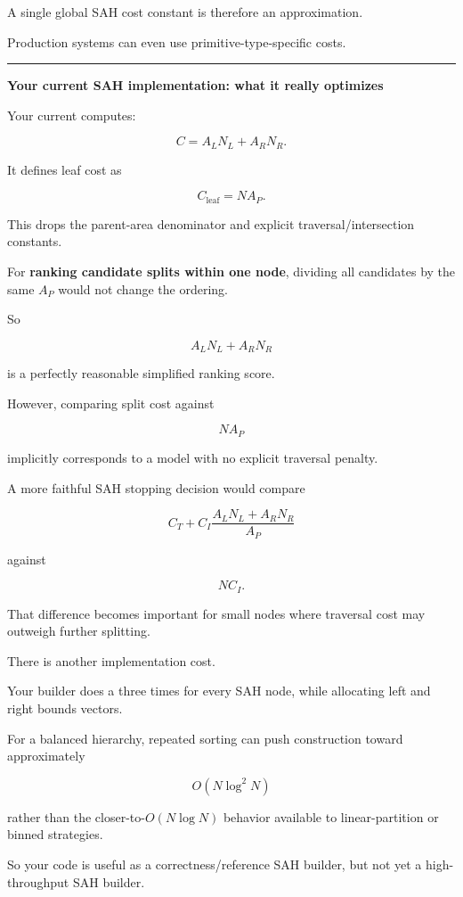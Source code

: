 A single global SAH cost constant is therefore an approximation.

Production systems can even use primitive-type-specific costs.

\begin{center}\rule{0.5\linewidth}{0.5pt}\end{center}

\textbf{Your current SAH implementation: what it really optimizes}

Your current  computes:

\[
C=
A_LN_L+A_RN_R.
\]

It defines leaf cost as

\[
C_{\text{leaf}}
=
NA_P.
\]

This drops the parent-area denominator and explicit traversal/intersection constants.

For \textbf{ranking candidate splits within one node}, dividing all candidates by the same \(A_P\) would not change the ordering.

So

\[
A_LN_L+A_RN_R
\]

is a perfectly reasonable simplified ranking score.

However, comparing split cost against

\[
NA_P
\]

implicitly corresponds to a model with no explicit traversal penalty.

A more faithful SAH stopping decision would compare

\[
C_T+
C_I\frac{A_LN_L+A_RN_R}{A_P}
\]

against

\[
NC_I.
\]

That difference becomes important for small nodes where traversal cost may outweigh further splitting.

There is another implementation cost.

Your builder does a  three times for every SAH node, while allocating left and right bounds vectors.

For a balanced hierarchy, repeated sorting can push construction toward approximately

\[
O(N\log^2 N)
\]

rather than the closer-to-\(O(N\log N)\) behavior available to linear-partition or binned strategies.

So your code is useful as a correctness/reference SAH builder, but not yet a high-throughput SAH builder.

